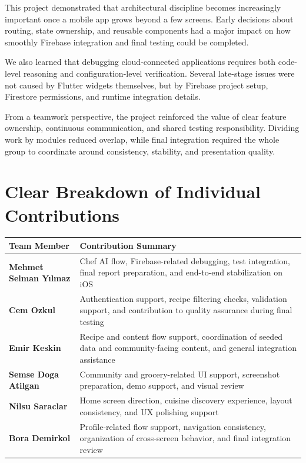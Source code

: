 \documentclass[11pt,a4paper]{article}
\begin{document}
This project demonstrated that architectural discipline becomes increasingly important once a mobile app grows beyond a few screens. Early decisions about routing, state ownership, and reusable components had a major impact on how smoothly Firebase integration and final testing could be completed.

We also learned that debugging cloud-connected applications requires both code-level reasoning and configuration-level verification. Several late-stage issues were not caused by Flutter widgets themselves, but by Firebase project setup, Firestore permissions, and runtime integration details.

From a teamwork perspective, the project reinforced the value of clear feature ownership, continuous communication, and shared testing responsibility. Dividing work by modules reduced overlap, while final integration required the whole group to coordinate around consistency, stability, and presentation quality.

\section{Clear Breakdown of Individual Contributions}

\begin{center}
\begin{tabularx}{0.96\textwidth}{>{\bfseries}l X}
\toprule
Team Member & Contribution Summary \\
\midrule
Mehmet Selman Y{\i}lmaz & Chef AI flow, Firebase-related debugging, test integration, final report preparation, and end-to-end stabilization on iOS \\
Cem Ozkul & Authentication support, recipe filtering checks, validation support, and contribution to quality assurance during final testing \\
Emir Keskin & Recipe and content flow support, coordination of seeded data and community-facing content, and general integration assistance \\
Semse Doga Atilgan & Community and grocery-related UI support, screenshot preparation, demo support, and visual review \\
Nilsu Saraclar & Home screen direction, cuisine discovery experience, layout consistency, and UX polishing support \\
Bora Demirkol & Profile-related flow support, navigation consistency, organization of cross-screen behavior, and final integration review \\
\bottomrule
\end{tabularx}
\end{center}
\end{document}
